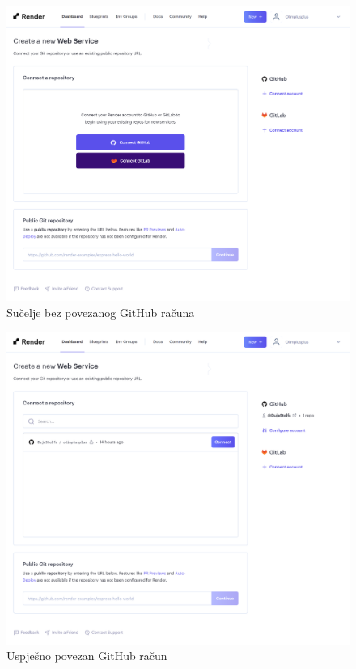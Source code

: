         \begin{figure}[htp]
			\includegraphics[scale=0.17]{slike/deploy_5.png}
			\centering
			\caption{Sučelje bez povezanog GitHub računa}
            \label{fig:dep-5}
		\end{figure}

        \begin{figure}[htp]
			\includegraphics[scale=0.17]{slike/deploy_6.png}
			\centering
			\caption{Uspješno povezan GitHub račun}
            \label{fig:dep-6}
		\end{figure}

